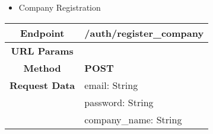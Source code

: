     \begin{itemize}
        \item Company Registration
    \end{itemize}
    \begin{adjustwidth}{1cm}{}
        \begin{longtable}{|c|l|}
            \hline
            \textbf{Endpoint} & /auth/register\_company \\
            \hline
            \textbf{URL Params} &  \\
            \hline
            \textbf{Method} & \textbf{POST} \\
            \hline
            \textbf{Request Data} & email: String \\
            &                 password: String \\
            &                 company\_name: String \\


\end{longtable}
\end{adjustwidth}
